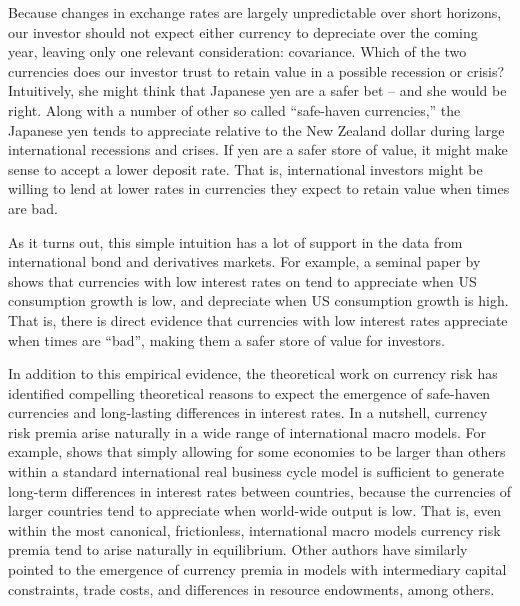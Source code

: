 \documentclass[12pt,letter]{article}
\theoremstyle{break} \theorembodyfont{\normalfont\itshape}
\theoremstyle{break}
\theoremstyle{break} \theorembodyfont{\normalfont\itshape}
\theoremstyle{break} \theorembodyfont{\normalfont\itshape}
\begin{document}
Because changes in exchange rates are largely unpredictable over short horizons, our investor should not expect either currency to depreciate over the coming year, leaving only one relevant consideration: covariance. Which of the two currencies does our investor trust to retain value in a possible recession or crisis? Intuitively, she might think that Japanese yen are a safer bet -- and she would be right. Along with a number of other so called ``safe-haven currencies,'' the Japanese yen tends to appreciate relative to the New Zealand dollar during large international recessions and crises. If yen are a safer store of value, it might make sense to accept a lower deposit rate. That is, international investors might be willing to lend at lower rates in currencies they expect to retain value when times are bad. 

As it turns out, this simple intuition has a lot of support in the
data from international bond and derivatives markets. For example, a seminal paper by \citet{LustigVerdelhan2007}
shows that currencies with low interest rates on tend to appreciate
when US consumption growth is low, and depreciate when US consumption
growth is high. That is, there is direct evidence that currencies with
low interest rates appreciate when times are ``bad'', making them a
safer store of value for investors.

In addition to this empirical evidence, the theoretical work on
currency risk has identified compelling theoretical reasons to expect
the emergence of safe-haven currencies and long-lasting differences in
interest rates. In a nutshell, currency risk premia arise naturally in
a wide range of international macro models. For example, \citet{Hassan2013}
shows that simply allowing for some economies to be larger than others
within a standard international real business cycle model is
sufficient to generate long-term differences in interest rates between
countries, because the currencies of larger countries tend to
appreciate when world-wide output is low. That is, even within the
most canonical, frictionless, international macro models currency
risk premia tend to arise naturally in equilibrium. Other authors have
similarly pointed to the emergence of currency premia in models with
intermediary capital constraints, trade costs, and differences in
resource endowments, among others.
\end{document}
